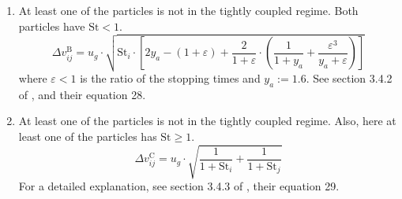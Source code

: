 \begin{enumerate}
            \item At least one of the particles is not in the tightly coupled regime.
                Both particles have $\text{St} < 1$. \\
                \begin{equation}
                    \Delta v_{ij}^\text{B} = u_g \cdot \sqrt{
                        \text{St}_i \cdot \left[
                            2y_a - (1+\varepsilon) + \frac{2}{1+\varepsilon} \cdot \left(
                                \frac{1}{1+y_a} + \frac{\varepsilon^3}{y_a+\varepsilon}
                            \right)
                        \right] 
                    }
                \end{equation}
                where $\varepsilon < 1$ is the ratio of the stopping times 
                and $y_a := 1.6$. 
                See section 3.4.2 of \cite{ormel_cuzzi_2007}, and their equation 28.

            \item At least one of the particles is not in the tightly coupled regime. 
                Also, here at least one of the particles has $\text{St} \geq 1$. \\
                \begin{equation}
                    \Delta v_{ij}^\text{C} = u_g \cdot \sqrt{
                        \frac{1}{1+\text{St}_i} + \frac{1}{1+\text{St}_j}
                    }
                \end{equation}
                For a detailed explanation, see section 3.4.3 of \cite{ormel_cuzzi_2007}, 
                their equation 29.

        \end{enumerate}

